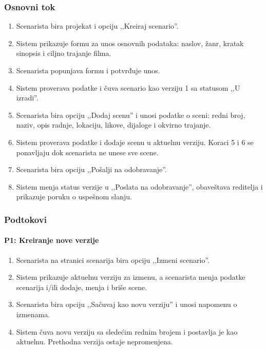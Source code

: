 \subsubsection*{Osnovni tok}
\begin{enumerate}
    \item Scenarista bira projekat i opciju ,,Kreiraj scenario''.
    \item Sistem prikazuje formu za unos osnovnih podataka: naslov, žanr, kratak sinopsis i ciljno trajanje filma.
    \item Scenarista popunjava formu i potvrđuje unos.
    \item Sistem proverava podatke i čuva scenario kao verziju 1 sa statusom ,,U izradi''.
    \item Scenarista bira opciju ,,Dodaj scenu'' i unosi podatke o sceni: redni broj, naziv, opis radnje, lokaciju, likove, dijaloge i okvirno trajanje.
    \item Sistem proverava podatke i dodaje scenu u aktuelnu verziju. Koraci 5 i 6 se ponavljaju dok scenarista ne unese sve scene.
    \item Scenarista bira opciju ,,Pošalji na odobravanje''.
    \item Sistem menja status verzije u ,,Poslata na odobravanje'', obaveštava reditelja i prikazuje poruku o uspešnom slanju.
\end{enumerate}

\subsubsection*{Podtokovi}

\paragraph*{P1: Kreiranje nove verzije}
\begin{enumerate}
    \item Scenarista na stranici scenarija bira opciju ,,Izmeni scenario''.
    \item Sistem prikazuje aktuelnu verziju za izmenu, a scenarista menja podatke scenarija i/ili dodaje, menja i briše scene.
    \item Scenarista bira opciju ,,Sačuvaj kao novu verziju'' i unosi napomenu o izmenama.
    \item Sistem čuva novu verziju sa sledećim rednim brojem i postavlja je kao aktuelnu. Prethodna verzija ostaje nepromenjena.
\end{enumerate}


